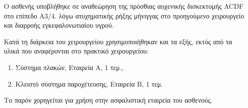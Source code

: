 \documentclass[10pt,greek]{article}
\begin{document}
\begin{PatientInfo}
\end{PatientInfo}

Ο ασθενής υποβλήθηκε σε αναθεώρηση της πρόσθιας αυχενικής δισκεκτομής ACDF στο επίπεδο Α3/4.
λόγω ατυχηματικής ρήξης μήνιγγας στο προηγούμενο χειρουργείο και διαρροής εγκεφαλονωτιαίου υγρού.

Κατά τη διάρκεια του χειρουργείου χρησιμοποιήθηκαν και τα εξής, εκτός από τα υλικά που αναφέρονται στο πρακτικό χειρουργείου:

\begin{enumerate}
    \item Σύστημα πλακών, Εταιρεία Α, 1 τεμ.,
    \item Κλειστό σύστημα παροχέτευσης, Εταιρεία Β, 1 τεμ.
\end{enumerate}

Το παρόν χορηγείται για χρήση στην ασφαλιστική εταιρεία του ασθενούς.
\end{document}
